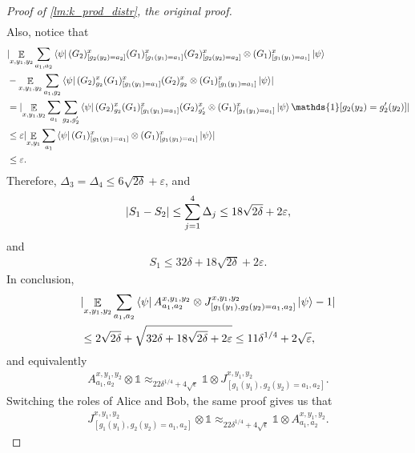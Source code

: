 \documentclass[11pt]{article}
\theoremstyle{plain}
\theoremstyle{definition}
\DeclarePairedDelimiter{\abs}{\lvert}{\rvert}
\newcommand {\bra} [1] {\ensuremath{ \left\langle #1 \right| }}
\newcommand {\ket} [1] {\ensuremath{ \left| #1 \right\rangle }}
\DeclareMathOperator*{\bigE}{\mathbb{E}}
\newcommand {\id} {\ensuremath{\mathds{1}}}
\newcommand{\ep} {\ensuremath{\varepsilon}}
\newcommand{\x}{\otimes}
\newcommand{\appd}[1]{\approx_{#1}}
\newcommand{\1}{\mathbb{1}} %
\newcommand{\se}{\sqrt{\epsilon}}
\begin{document}
\begin{proof}[Proof of \cref{lm:k_prod_distr}, the original proof]
\begin{align*}
	\end{align*}	
	Also, notice that
	\begin{align*}
		&\abs{ \bigE_{x,y_1,y_2} \sum_{a_1, a_2} \bra{\psi}  
		(G_2)^x_{[g_2(y_2) = a_2]} (G_1)^x_{[g_1(y_1) = a_1]}  (G_2)^x_{[g_2(y_2) = a_2]}  \x  (G_1)^x_{[g_1(y_1) = a_1]} \ket{\psi} \\
		&- \bigE_{x,y_1,y_2} \sum_{a_1, g_2} \bra{\psi}  
		(G_2)^x_{g_2} (G_1)^x_{[g_1(y_1) = a_1]}  (G_2)^x_{g_2}  \x  (G_1)^x_{[g_1(y_1) = a_1]} \ket{\psi}} \\
		&= \abs{  \bigE_{x,y_1,y_2} \sum_{a_1} \sum_{g_2, g_2'} \bra{\psi} (G_2)^x_{g_2} (G_1)^x_{[g_1(y_1) = a_1]}  (G_2)^x_{g_2'}  \x  (G_1)^x_{[g_1(y_1) = a_1]} \ket{\psi} \id[g_2(y_2) = g_2'(y_2)]}  \\
		&\leq \ep \abs{ \bigE_{x,y_1} \sum_{a_1} \bra{\psi} (G_1)^x_{[g_1(y_1) = a_1]} \x (G_1)^x_{[g_1(y_1) = a_1]} \ket{\psi}} \\
		&\leq \ep.
	\end{align*}
	Therefore, $\Delta_3 = \Delta_4 \leq 6\sqrt{2\delta}  + \ep$, and
	\begin{align*}
		\abs{ S_1 - S_2 } \leq \sum_{j = 1}^4 \Delta_j \leq 18\sqrt{2 \delta} + 2 \ep,
	\end{align*}
	and
	\begin{align*}
		S_1 \leq 32\delta + 18\sqrt{2\delta} + 2\ep.
	\end{align*}
	In conclusion,
	\begin{align*}
		&\abs{ \bigE_{x,y_1,y_2} \sum_{a_1, a_2} \bra{\psi} A^{x,y_1,y_2}_{a_1,a_2} \x J^{x,y_1,y_2}_{[g_1(y_1),g_2(y_2) = a_1, a_2]} \ket{\psi}  - 1} \\
		 &\leq 2\sqrt{2\delta} + \sqrt{ 32\delta + 18\sqrt{2\delta} + 2 \ep} \leq 11 \delta^{1/4} + 2 \sqrt{\ep},
	\end{align*}
	and equivalently
	\begin{align*}
		A^{x,y_1,y_2}_{a_1,a_2} \x \id \appd{22 \delta^{1/4} + 4\se} \id \x J^{x,y_1,y_2}_{[g_1(y_1),g_2(y_2) = a_1, a_2]}.
	\end{align*}
	Switching the roles of Alice and Bob, the same proof gives us that 
	\begin{align*}
		 J^{x,y_1,y_2}_{[g_1(y_1),g_2(y_2) = a_1, a_2]} \x \id \appd{22 \delta^{1/4} + 4\se} \id \x A^{x,y_1,y_2}_{a_1,a_2}.
	\end{align*}
	

\end{proof}
\end{document}
